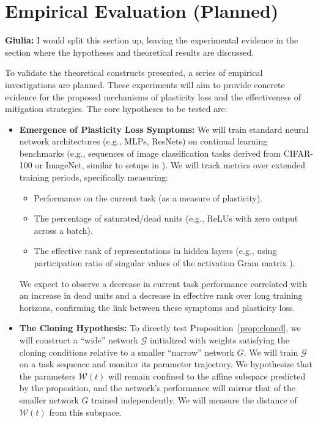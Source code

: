 \documentclass{article}
\newcommand{\giulia}[1]{{\color{ForestGreen}\textbf{Giulia:} #1}}
\begin{document}
\section{Empirical Evaluation (Planned)}
\label{sec:experiments}
\giulia{I would split this section up, leaving the experimental evidence in the section where the hypotheses and theoretical results are discussed.}

To validate the theoretical constructs presented, a series of empirical investigations are planned. These experiments will aim to provide concrete evidence for the proposed mechanisms of plasticity loss and the effectiveness of mitigation strategies. The core hypotheses to be tested are:
\begin{itemize}
    \item \textbf{Emergence of Plasticity Loss Symptoms:} We will train standard neural network architectures (e.g., MLPs, ResNets) on continual learning benchmarks (e.g., sequences of image classification tasks derived from CIFAR-100 or ImageNet, similar to setups in \cite{dohare2024loss}). We will track metrics over extended training periods, specifically measuring:
        \begin{itemize}
            \item Performance on the current task (as a measure of plasticity).
            \item The percentage of saturated/dead units (e.g., ReLUs with zero output across a batch).
            \item The effective rank of representations in hidden layers (e.g., using participation ratio of singular values of the activation Gram matrix \cite{huh2022lowrank}).
        \end{itemize}
        We expect to observe a decrease in current task performance correlated with an increase in dead units and a decrease in effective rank over long training horizons, confirming the link between these symptoms and plasticity loss.

    \item \textbf{The Cloning Hypothesis:} To directly test Proposition~\ref{prop:cloned}, we will construct a ``wide'' network $\mathcal{G}$ initialized with weights satisfying the cloning conditions relative to a smaller ``narrow'' network $G$. We will train $\mathcal{G}$ on a task sequence and monitor its parameter trajectory. We hypothesize that the parameters $\mathcal{W}(t)$ will remain confined to the affine subspace predicted by the proposition, and the network's performance will mirror that of the smaller network $G$ trained independently. We will measure the distance of $\mathcal{W}(t)$ from this subspace.


\end{itemize}
\end{document}

